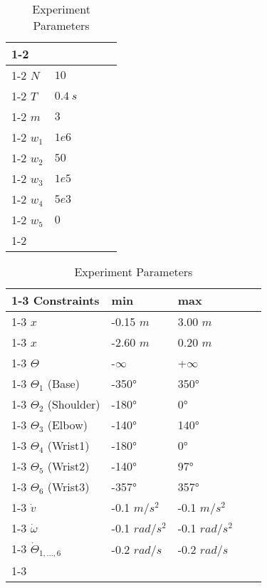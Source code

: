 	\begin{table}[]
	
	\centering

	\begin{tabular}{|l|l|l|ll}
	\cline{1-2}
	\multicolumn{2}{|l|}{ \textbf{Parameters} }	\\ \cline{1-2}
	$N$     				&  $10$ 	      					\\ \cline{1-2}
	$T$     				&  $0.4\ s$  	      					\\ \cline{1-2}
	$m$     				&  $3$ 	      						\\ \cline{1-2}
	$w_1$    				&  $1e6$       						\\ \cline{1-2}
	$w_2$    				&  $50$       						\\ \cline{1-2}
	$w_3$    				&  $1e5$       						\\ \cline{1-2}
	$w_4$    				&  $5e3$       						\\ \cline{1-2}
	$w_5$    				&  $0$      						\\ \cline{1-2}
	\end{tabular}
	\quad
	\begin{tabular}{|l|l|l|ll}
	\cline{1-3}
	\textbf{Constraints}    	& \textbf{min} 					& \textbf{max}			\\ \cline{1-3}
	$x$		 			 		&  -0.15 $m$ 					&  3.00 $m$ 			\\ \cline{1-3}
	$x$		 			 		&  -2.60 $m$ 					&  0.20 $m$ 			\\ \cline{1-3}
	$\Theta$ 			 		&  -$\infty$  					&  +$\infty$ 			\\ \cline{1-3}
	$\Theta_1$ (Base)			&  -350°  						&  350° 				\\ \cline{1-3}
	$\Theta_2$ (Shoulder)		&  -180° 						&  0°		 			\\ \cline{1-3}
	$\Theta_3$ (Elbow) 			&  -140° 						&  140°		 			\\ \cline{1-3}
	$\Theta_4$ (Wrist1) 		&  -180° 						&  0°		 			\\ \cline{1-3}
	$\Theta_5$ (Wrist2)			&  -140° 						&  97°		 			\\ \cline{1-3} 
	$\Theta_6$ (Wrist3) 		&  -357° 						&  357°		 			\\ \cline{1-3}
	$\dot{v}$ 			 		&  -0.1 $m/s^2$					&  -0.1 $m/s^2$ 		\\ \cline{1-3}
	$\dot{\omega}$		 		&  -0.1 $rad/s^2$ 				&  -0.1 $rad/s^2$		\\ \cline{1-3}
	$\dot{\Theta}_{1,\dots,6}$	&  -0.2 $rad/s$					&  -0.2 $rad/s$ 		\\ \cline{1-3}
	\end{tabular}
	\caption{Experiment Parameters}
	\label{tableparam1}
	\end{table}

